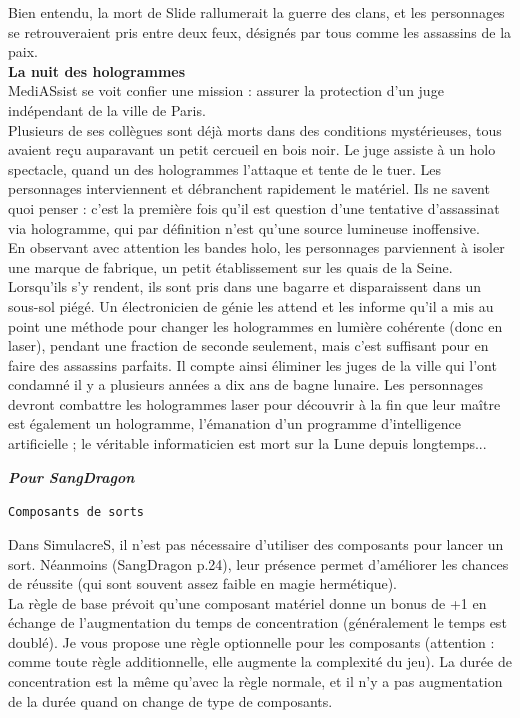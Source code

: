 \documentclass[11pt,twoside,a4paper]{article}
\begin{document}
\begin{multicols*}{3}
{Bien entendu, la mort de Slide rallumerait la guerre des clans, et les personnages se retrouveraient pris entre deux feux, d{\'e}sign{\'e}s par tous comme les assassins de la paix.~\\

\textbf{La nuit des hologrammes}~\\

MediASsist se voit confier une mission : assurer la protection d'un juge ind{\'e}pendant de la ville de Paris.~\\

Plusieurs de ses coll{\`e}gues sont d{\'e}j{\`a} morts dans des conditions myst{\'e}rieuses, tous avaient re\c{c}u auparavant un petit cercueil en bois noir. Le juge assiste {\`a} un holo spectacle, quand un des hologrammes l'attaque et tente de le tuer. Les personnages interviennent et d{\'e}branchent rapidement le mat{\'e}riel. Ils ne savent quoi penser : c'est la premi{\`e}re fois qu'il est question d'une tentative d'assassinat via hologramme, qui par d{\'e}finition n'est qu'une source lumineuse inoffensive.~\\

En observant avec attention les bandes holo, les personnages parviennent {\`a} isoler une marque de fabrique, un petit {\'e}tablissement sur les quais de la Seine. Lorsqu'ils s'y rendent, ils sont pris dans une bagarre et disparaissent dans un sous-sol pi{\'e}g{\'e}. Un {\'e}lectronicien de g{\'e}nie les attend et les informe qu'il a mis au point une m{\'e}thode pour changer les hologrammes en lumi{\`e}re coh{\'e}rente (donc en laser), pendant une fraction de seconde seulement, mais c'est suffisant pour en faire des assassins parfaits. Il compte ainsi {\'e}liminer les juges de la ville qui l'ont condamn{\'e} il y a plusieurs ann{\'e}es a dix ans de bagne lunaire. Les personnages devront combattre les hologrammes laser pour d{\'e}couvrir {\`a} la fin que leur ma{\^i}tre est {\'e}galement un hologramme, l'{\'e}manation d'un programme d'intelligence artificielle ; le v{\'e}ritable informaticien est mort sur la Lune depuis longtemps...~\\

\clearpage

\textbf{\textit{Pour SangDragon}}

\texttt{Composants de sorts}

Dans SimulacreS, il n'est pas n{\'e}cessaire d'utiliser des composants pour lancer un sort. N{\'e}anmoins (SangDragon p.24), leur pr{\'e}sence permet d'am{\'e}liorer les chances de r{\'e}ussite (qui sont souvent assez faible en magie herm{\'e}tique).~\\
La r{\`e}gle de base pr{\'e}voit qu'une composant mat{\'e}riel donne un bonus de +1 en {\'e}change de l'augmentation du temps de concentration (g{\'e}n{\'e}ralement le temps est doubl{\'e}). Je vous propose une r{\`e}gle optionnelle pour les composants (attention : comme toute r{\`e}gle additionnelle, elle augmente la complexit{\'e} du jeu). La dur{\'e}e de concentration est la m{\^e}me qu'avec la r{\`e}gle normale, et il n'y a pas augmentation de la dur{\'e}e quand on change de type de composants.~\\

}
\end{multicols*}
\end{document}
